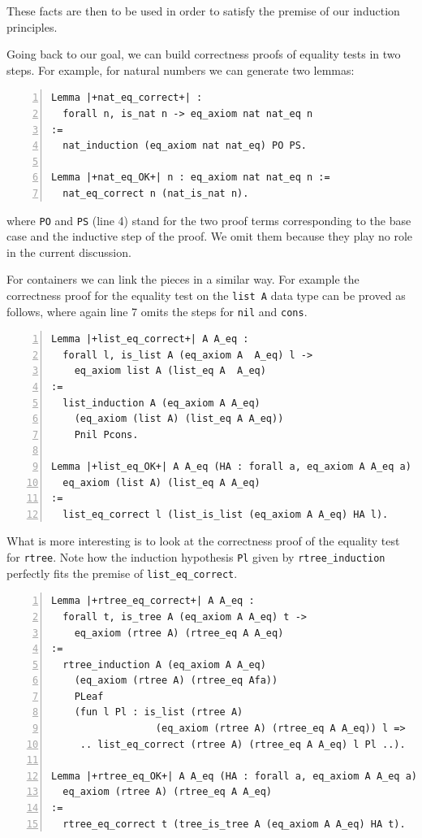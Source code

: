 \documentclass[sigplan,10pt,review]{acmart}\settopmatter{printfolios=true,printccs=false,printacmref=false}
\begin{document}
\noindent
These facts are then to be used in order to satisfy the
premise of our induction principles. 

Going back to our goal, we can build correctness
proofs of equality tests in two steps.
For example, for natural numbers we can generate two
lemmas:

\begin{minipage}{\textwidth}\begin{lstlisting}[numbers=left]
Lemma |+nat_eq_correct+| :
  forall n, is_nat n -> eq_axiom nat nat_eq n
:=
  nat_induction (eq_axiom nat nat_eq) PO PS.

Lemma |+nat_eq_OK+| n : eq_axiom nat nat_eq n :=
  nat_eq_correct n (nat_is_nat n).
\end{lstlisting}\end{minipage}

\noindent
where \lstinline+PO+ and \lstinline+PS+ (line 4) stand for
the two proof terms corresponding to the base case and the inductive
step of the proof. We omit them because they play no role in the
current discussion.

For containers we can link the pieces in a similar way.
For example the correctness proof
for the equality test on the \lstinline+list A+ data type can be
proved as follows, where again line 7 omits the steps for
\lstinline+nil+ and \lstinline+cons+.

\begin{minipage}{\textwidth}\begin{lstlisting}[numbers=left]
Lemma |+list_eq_correct+| A A_eq :
  forall l, is_list A (eq_axiom A  A_eq) l ->
    eq_axiom list A (list_eq A  A_eq)
:=
  list_induction A (eq_axiom A A_eq)
    (eq_axiom (list A) (list_eq A A_eq))
    Pnil Pcons.

Lemma |+list_eq_OK+| A A_eq (HA : forall a, eq_axiom A A_eq a) l :
  eq_axiom (list A) (list_eq A A_eq)
:=
  list_eq_correct l (list_is_list (eq_axiom A A_eq) HA l).
\end{lstlisting}\end{minipage}

\noindent
What is more interesting is to look at the correctness 
proof of the equality test
for \lstinline+rtree+. Note how the induction hypothesis
\lstinline+Pl+
given by \lstinline+rtree_induction+ perfectly fits
the premise of \lstinline+list_eq_correct+.

\begin{minipage}{\textwidth}\begin{lstlisting}[numbers=left]
Lemma |+rtree_eq_correct+| A A_eq :
  forall t, is_tree A (eq_axiom A A_eq) t ->
    eq_axiom (rtree A) (rtree_eq A A_eq)
:=
  rtree_induction A (eq_axiom A A_eq)
    (eq_axiom (rtree A) (rtree_eq Afa))
    PLeaf
    (fun l Pl : is_list (rtree A) 
                  (eq_axiom (rtree A) (rtree_eq A A_eq)) l =>
     .. list_eq_correct (rtree A) (rtree_eq A A_eq) l Pl ..).

Lemma |+rtree_eq_OK+| A A_eq (HA : forall a, eq_axiom A A_eq a) t :
  eq_axiom (rtree A) (rtree_eq A A_eq)
:=
  rtree_eq_correct t (tree_is_tree A (eq_axiom A A_eq) HA t).
\end{lstlisting}\end{minipage}
\end{document}
